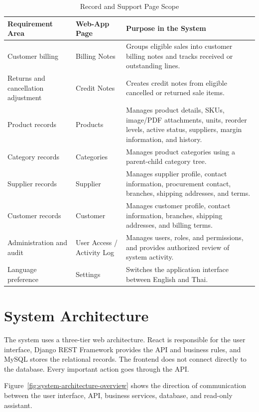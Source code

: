 \begin{table}[H]
	\centering
	\BlackbookTableSetup
	\caption{Record and Support Page Scope}
	\label{tab:record-support-page-map}
	\begin{tabularx}{\textwidth}{|B{2.8cm}|B{2.8cm}|Z|}
		\hline
		\textbf{Requirement Area} & \textbf{Web-App Page} & \textbf{Purpose in the System} \\ \hline
		Customer billing & Billing Notes & Groups eligible sales into customer billing notes and tracks received or outstanding lines. \\ \hline
		Returns and cancellation adjustment & Credit Notes & Creates credit notes from eligible cancelled or returned sale items. \\ \hline
		Product records & Products & Manages product details, SKUs, image/PDF attachments, units, reorder levels, active status, suppliers, margin information, and history. \\ \hline
		Category records & Categories & Manages product categories using a parent-child category tree. \\ \hline
		Supplier records & Supplier & Manages supplier profile, contact information, procurement contact, branches, shipping addresses, and terms. \\ \hline
		Customer records & Customer & Manages customer profile, contact information, branches, shipping addresses, and billing terms. \\ \hline
		Administration and audit & User Access / Activity Log & Manages users, roles, and permissions, and provides authorized review of system activity. \\ \hline
		Language preference & Settings & Switches the application interface between English and Thai. \\ \hline
	\end{tabularx}
\end{table}

\section{System Architecture}
The system uses a three-tier web architecture. React is responsible for the user interface, Django REST Framework provides the API and business rules, and MySQL stores the relational records. The frontend does not connect directly to the database. Every important action goes through the API.

Figure~\ref{fig:system-architecture-overview} shows the direction of communication between the user interface, API, business services, database, and read-only assistant.

